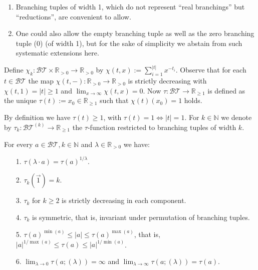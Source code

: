 \documentclass{report}
\begin{document}
\begin{enumerate}
\begin{enumerate}
\begin{enumerate}
				\item Branching tuples of width 1, which do not represent ``real branchings'' but
				``reductions'', are convenient to allow.
				
				\item One could also allow the empty branching tuple as well as the zero branching tuple (0) (of width 1), but for the sake of simplicity we abstain from
				such systematic extensions here.
			\end{enumerate}
			
			
			{ Define $\chi _k : \mathcal{BT} \times \mathbb{R}_{>0} \to \mathbb{R}_{>0}$ by $\chi (t,x) :=
				\sum^{|t|}_{i=1} x^{-t_i}$. Observe
				that for each $t \in \mathcal{BT}$ the map $\chi (t,-) : \mathbb{R}_{>0} \to \mathbb{R}_{>0}$ is strictly decreasing with
				$\chi (t,1) = |t| \geq 1$ and $\lim _{x\to \infty} \chi (t,x) = 0$. Now $\tau : \mathcal{BT} \to \mathbb{R}_{\geq 1} $ is defined as the
				unique $\tau (t) := x_0 \in\mathbb{R}_{\geq 1} $ such that $\chi (t)(x_0 ) = 1$ holds.}
			
			By definition we have $\tau (t) \geq 1$, with $\tau (t) = 1 \Leftrightarrow |t| = 1$. For $k \in \mathbb{N} $ we denote
			by $\tau_k : \mathcal{BT}^{(k)}
			\to \mathbb{R}_{\geq 1} $ the $\tau $-function restricted to branching tuples of width $k$.
			
			
			{\lem For every $a \in \mathcal{BT} , k \in \mathbb{N}$ and $\lambda \in \mathbb{R}_{>0}$ we have:
				
				\begin{enumerate}
					\item[1.]$\tau (\lambda \cdot a) = \tau (a)^{1/\lambda} $.
					
					\item[2.] $\tau_k (\vec{1}) = k$.
					
					\item[3.] $\tau_k$ for $k \geq 2$ is strictly decreasing in each component.
					
					\item[4.] $\tau_k$ is symmetric, that is, invariant under permutation of branching tuples.
					
					\item[5.] $\tau (a)^{\min(a)} \leq |a| \leq \tau (a)^{\max(a)}$, that is, $|a|^{1/\max(a)} \leq \tau (a) \leq |a|^{1/\min(a)}$.
					
					\item[6.] $\lim_{\lambda \to 0} \tau (a;(\lambda )) = \infty$ and $\lim _{\lambda \to \infty }\tau (a;(\lambda )) = \tau (a)$.
				\end{enumerate}}
				

\end{enumerate}
\end{enumerate}
\end{document}
